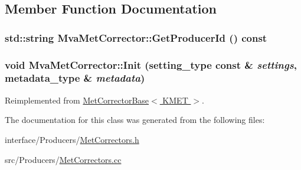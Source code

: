 \subsection{Member Function Documentation}
\hypertarget{classMvaMetCorrector_a8d8746113879239a418a3a22ee04cc99}{
\subsubsection[{GetProducerId}]{\setlength{\rightskip}{0pt plus 5cm}std::string MvaMetCorrector::GetProducerId () const}}
\label{classMvaMetCorrector_a8d8746113879239a418a3a22ee04cc99}
\hypertarget{classMvaMetCorrector_a82861f8921f0f9d792acd4f79ef1cff5}{
\subsubsection[{Init}]{\setlength{\rightskip}{0pt plus 5cm}void MvaMetCorrector::Init (setting\_\-type const \& {\em settings}, \/  metadata\_\-type \& {\em metadata})}}
\label{classMvaMetCorrector_a82861f8921f0f9d792acd4f79ef1cff5}


Reimplemented from \hyperlink{classMetCorrectorBase_a16b625ee626c0cead5c6c4d65ac180e4}{MetCorrectorBase$<$ KMET $>$}.

The documentation for this class was generated from the following files:\begin{DoxyCompactItemize}
\item 
interface/Producers/\hyperlink{MetCorrectors_8h}{MetCorrectors.h}\item 
src/Producers/\hyperlink{MetCorrectors_8cc}{MetCorrectors.cc}\end{DoxyCompactItemize}
